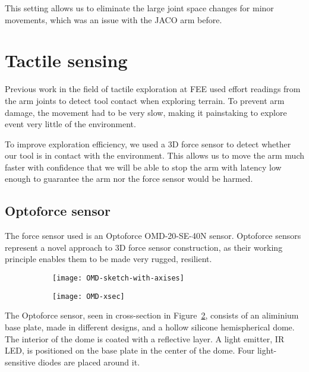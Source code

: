 \documentclass[buriama8_dp.tex]{subfiles}
\begin{document}
This setting allows us to eliminate the large joint space changes for minor movements, which was an issue with the JACO arm before.

\section{Tactile sensing}

Previous work in the field of tactile exploration at FEE \cite{vojta} used effort readings from the arm joints to detect tool contact when exploring terrain. To prevent arm damage, the movement had to be very slow, making it painstaking to explore event very little of the environment.

To improve exploration efficiency, we used a 3D force sensor to detect whether our tool is in contact with the environment. This allows us to move the arm much faster with confidence that we will be able to stop the arm with latency low enough to guarantee the arm nor the force sensor would be harmed.

\subsection{Optoforce sensor}
\label{subsec:opto}

The force sensor used is an Optoforce OMD-20-SE-40N sensor. Optoforce sensors represent a novel approach to 3D force sensor construction, as their working principle enables them to be made very rugged, resilient.


\begin{figure}[ht]
  \begin{subfigure}[t]{0.4\textwidth}
    \texttt{[image: OMD-sketch-with-axises]}
    \caption{}
    \label{fig:omd_geom}
  \end{subfigure}
  \begin{subfigure}[t]{0.4\textwidth}
    \texttt{[image: OMD-xsec]}
    \caption{}
    \label{fig:omd_xsec}
  \end{subfigure}

  \caption[Optoforce sensor]{}
  \label{fig:decomps}
\end{figure}


The Optoforce sensor, seen in cross-section in Figure~\ref{fig:omd_xsec}, consists of an aliminium base plate, made in different designs, and a hollow silicone hemispherical dome. The interior of the dome is coated with a reflective layer. A light emitter, IR LED, is positioned on the base plate in the center of the dome. Four light-sensitive diodes are placed around it.
\end{document}

